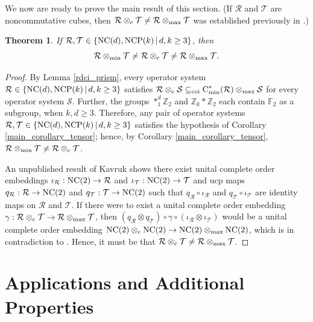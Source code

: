 \documentclass{amsart}
\newtheorem{theorem}{Theorem}[section]
\theoremstyle{definition}
\theoremstyle{remark}
\newcommand\ftwo{{\mathbb F}_2}
\newcommand\osr{{\mathcal R}}
\newcommand\oss{{\mathcal S}}
\newcommand\ost{{\mathcal T}}
\newcommand\omin{\otimes_{\textrm{min}}}
\newcommand\omax{\otimes_{\textrm{max}}}
\newcommand\oc{\otimes_{\textrm c}}
\newcommand\cstare{{\textrm C}_{\textrm{min}}^*}              %
\numberwithin{equation}{section}
\begin{document}
We now are ready to prove the main result of this section. (If $\osr$ and $\ost$ are noncommutative cubes, 
then  $\osr\oc\ost \not = \osr\omax\ost$ was
established previously in \cite[Theorem 7.13]{farenick--kavruk--paulsen--todorov2014}.)

\begin{theorem}\label{main result tp}
If $\osr,\ost\in\{\mbox{\textrm{NC}}(d),\mbox{\textrm{NCP}}(k)\,|\,d,k\geq3\}$, then
 \[
 \osr\omin\ost \not= \osr\oc\ost \not = \osr\omax\ost.
 \]
\end{theorem}

\begin{proof} By Lemma \ref{rdci_prism},
every operator system $\osr\in\{\mbox{\textrm{NC}}(d),\mbox{\textrm{NCP}}(k)\,|\,d,k\geq3\}$
satisfies $\osr\oc\oss\subseteq_{\textrm{coi}}\cstare(\osr)\omax\oss$ for every operator system $\oss$.
Further, the groups $\ast_1^d\mathbb Z_2$ and $\mathbb Z_k*\mathbb Z_2$ each contain $\ftwo$ as a subgroup, when $k,d\geq3$.
Therefore, any pair of operator systems $\osr,\ost\in\{\mbox{\textrm{NC}}(d),\mbox{\textrm{NCP}}(k)\,|\,d,k\geq3\}$ satisfies the hypothesis of 
Corollary \ref{main_corollary_tensor}; hence, by Corollary \ref{main_corollary_tensor},
$\osr\omin\ost \not= \osr\oc\ost$.

An unpublished result of Kavruk \cite[Lemma 6.7]{kavruk2012} shows there exist unital complete order embeddings
$\iota_\osr:\mbox{\textrm{NC}}(2)\rightarrow\osr$ and $\iota_\ost:\mbox{\textrm{NC}}(2)\rightarrow\ost$ and ucp maps
$q_\osr:\osr\rightarrow\mbox{\textrm{NC}}(2)$ and $q_\ost:\ost\rightarrow\mbox{\textrm{NC}}(2)$ such that $q_\osr\circ\iota_\osr$
and $q_\ost\circ\iota_\ost$ are identity maps on $\osr$ and $\ost$. If there were to exist a unital complete order embedding
$\gamma:\osr\oc\ost \rightarrow\osr\omax\ost$, then $(q_\osr\otimes q_\ost)\circ\gamma\circ(\iota_\osr\otimes\iota_\ost)$
would be a unital complete order embedding 
$\mbox{\textrm{NC}}(2)\oc\mbox{\textrm{NC}}(2)\rightarrow\mbox{\textrm{NC}}(2)\omax\mbox{\textrm{NC}}(2)$, which is in contradiction to
\cite[Corollary 7.12]{farenick--kavruk--paulsen--todorov2014}. Hence, it must be that 
$\osr\oc\ost \not = \osr\omax\ost$.
\end{proof}


\section{Applications and Additional Properties}
\end{document}
